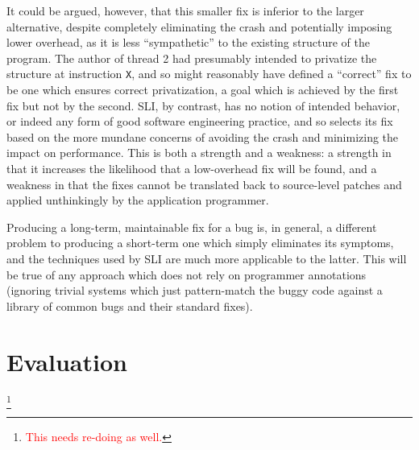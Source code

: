 \documentclass[10pt,twocolumn,preprint,natbib,authoryear]{sigplanconf}
\newcommand{\editorial}[1]{\textcolor{red}{\footnote{\textcolor{red}{#1}}}}
\begin{document}
It could be argued, however, that this smaller fix is inferior to the
larger alternative, despite completely eliminating the crash and
potentially imposing lower overhead, as it is less ``sympathetic'' to
the existing structure of the program.  The author of thread 2 had
presumably intended to privatize the structure at instruction
\verb|X|, and so might reasonably have defined a ``correct'' fix to be
one which ensures correct privatization, a goal which is achieved by
the first fix but not by the second.  SLI, by contrast, has no notion
of intended behavior, or indeed any form of good software engineering
practice, and so selects its fix based on the more mundane concerns of
avoiding the crash and minimizing the impact on performance.  This is
both a strength and a weakness: a strength in that it increases the
likelihood that a low-overhead fix will be found, and a weakness in
that the fixes cannot be translated back to source-level patches and
applied unthinkingly by the application programmer.

Producing a long-term, maintainable fix for a bug is, in general, a
different problem to producing a short-term one which simply
eliminates its symptoms, and the techniques used by SLI are much more
applicable to the latter.  This will be true of any approach which
does not rely on programmer annotations (ignoring trivial systems
which just pattern-match the buggy code against a library of common
bugs and their standard fixes).


\section{Evaluation}\editorial{This needs re-doing as well.}
\label{sect:evaluation}
\end{document}
